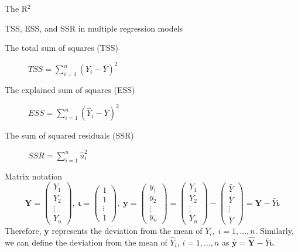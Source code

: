 \documentclass[presentation,10pt]{beamer}
\begin{document}
\begin{frame}[label={sec:orgf7774b4}]{The R\(^{\text{2}}\)}
\begin{block}{TSS, ESS, and SSR in multiple regression models}
\begin{description}
\item[{The total sum of squares (TSS)}] \(TSS = \sum_{i=1}^n (Y_i - \bar{Y})^2\)
\item[{The explained sum of squares (ESS)}] \(ESS = \sum_{i=1}^n (\hat{Y}_i - \bar{Y})^2\)
\item[{The sum of squared residuals (SSR)}] \(SSR = \sum_{i=1}^n \hat{u}_i^2\)
\end{description}
\end{block}

\begin{block}{Matrix notation}
\begin{equation*}
\mathbf{Y} =
\begin{pmatrix}
Y_1 \\
Y_2 \\
\vdots \\
Y_n
\end{pmatrix},\;
\boldsymbol{\iota} =
\begin{pmatrix}
1 \\
1 \\
\vdots \\
1
\end{pmatrix},\;
\mathbf{y} = 
\begin{pmatrix}
y_1 \\
y_2 \\
\vdots \\
y_n
\end{pmatrix}
 =
\begin{pmatrix}
Y_1 \\
Y_2 \\
\vdots \\
Y_n
\end{pmatrix}
-
\begin{pmatrix}
\bar{Y} \\
\bar{Y} \\
\vdots \\
\bar{Y}
\end{pmatrix}
=
\mathbf{Y} - \bar{Y} \boldsymbol{\iota}
\end{equation*}
Therefore, \(\mathbf{y}\) represents \alert{the deviation from the mean} of
\(Y_i,\; i=1,\ldots,n\). Similarly, we can define the deviation from the
mean of \(\hat{Y}_i,\, i=1, \ldots, n\) as \(\hat{\mathbf{y}} =
\hat{\mathbf{Y}} - \bar{Y} \boldsymbol{\iota}\).
\end{block}
\end{frame}
\end{document}
